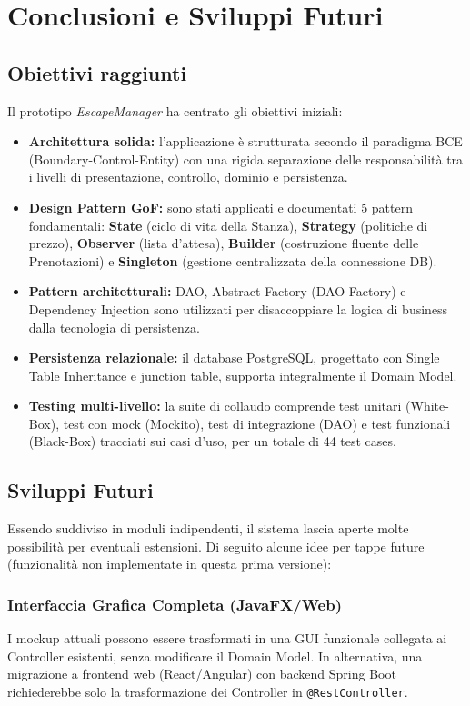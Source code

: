 \chapter{Conclusioni e Sviluppi Futuri}
\label{chap:conclusioni}

\section{Obiettivi raggiunti}
Il prototipo \textit{EscapeManager} ha centrato gli obiettivi iniziali:
\begin{itemize}
    \item \textbf{Architettura solida:} l'applicazione è strutturata secondo il paradigma BCE (Boundary-Control-Entity) con una rigida separazione delle responsabilità tra i livelli di presentazione, controllo, dominio e persistenza.
    \item \textbf{Design Pattern GoF:} sono stati applicati e documentati 5 pattern fondamentali: \textbf{State} (ciclo di vita della Stanza), \textbf{Strategy} (politiche di prezzo), \textbf{Observer} (lista d'attesa), \textbf{Builder} (costruzione fluente delle Prenotazioni) e \textbf{Singleton} (gestione centralizzata della connessione DB).
    \item \textbf{Pattern architetturali:} DAO, Abstract Factory (DAO Factory) e Dependency Injection sono utilizzati per disaccoppiare la logica di business dalla tecnologia di persistenza.
    \item \textbf{Persistenza relazionale:} il database PostgreSQL, progettato con Single Table Inheritance e junction table, supporta integralmente il Domain Model.
    \item \textbf{Testing multi-livello:} la suite di collaudo comprende test unitari (White-Box), test con mock (Mockito), test di integrazione (DAO) e test funzionali (Black-Box) tracciati sui casi d'uso, per un totale di 44 test cases.
\end{itemize}

\section{Sviluppi Futuri}

Essendo suddiviso in moduli indipendenti, il sistema lascia aperte molte possibilità per eventuali estensioni. Di seguito alcune idee per tappe future (funzionalità non implementate in questa prima versione):

\subsection{Interfaccia Grafica Completa (JavaFX/Web)}
I mockup attuali possono essere trasformati in una GUI funzionale collegata ai Controller esistenti, senza modificare il Domain Model. In alternativa, una migrazione a frontend web (React/Angular) con backend Spring Boot richiederebbe solo la trasformazione dei Controller in \texttt{@RestController}.

